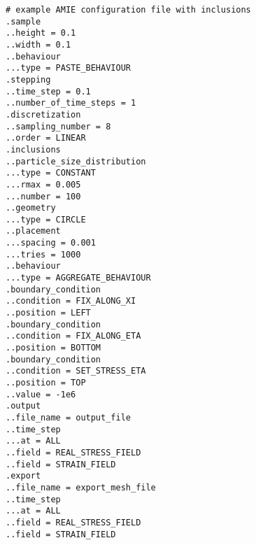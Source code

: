 \documentclass[10pt]{article}
\begin{document}
\verb+# example AMIE configuration file with inclusions+\\
\verb+.sample+\\
\verb+..height = 0.1+\\
\verb+..width = 0.1+\\
\verb+..behaviour+\\
\verb+...type = PASTE_BEHAVIOUR+\\
\verb+.stepping+\\
\verb+..time_step = 0.1+\\
\verb+..number_of_time_steps = 1+\\
\verb+.discretization+\\
\verb+..sampling_number = 8+\\
\verb+..order = LINEAR+\\
\verb+.inclusions+\\
\verb+..particle_size_distribution+\\
\verb+...type = CONSTANT+\\
\verb+...rmax = 0.005+\\
\verb+...number = 100+\\
\verb+..geometry+\\
\verb+...type = CIRCLE+\\
\verb+..placement+\\
\verb+...spacing = 0.001+\\
\verb+...tries = 1000+\\
\verb+..behaviour+\\
\verb+...type = AGGREGATE_BEHAVIOUR+\\
\verb+.boundary_condition+\\
\verb+..condition = FIX_ALONG_XI+\\
\verb+..position = LEFT+\\
\verb+.boundary_condition+\\
\verb+..condition = FIX_ALONG_ETA+\\
\verb+..position = BOTTOM+\\
\verb+.boundary_condition+\\
\verb+..condition = SET_STRESS_ETA+\\
\verb+..position = TOP+\\
\verb+..value = -1e6+\\
\verb+.output+\\
\verb+..file_name = output_file+\\
\verb+..time_step+\\
\verb+...at = ALL+\\
\verb+..field = REAL_STRESS_FIELD+\\
\verb+..field = STRAIN_FIELD+\\
\verb+.export+\\
\verb+..file_name = export_mesh_file+\\
\verb+..time_step+\\
\verb+...at = ALL+\\
\verb+..field = REAL_STRESS_FIELD+\\
\verb+..field = STRAIN_FIELD+
\end{document}
